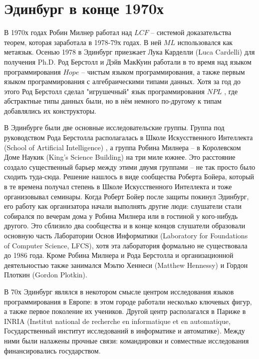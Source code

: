 \documentclass[14pt]{matmex-diploma-custom}
\begin{document}
\section{Эдинбург в конце 1970х}
В 1970х годах Робин Милнер работал над $LCF$ -- системой доказательства теорем, которая заработала в 1978-79х годах. В ней $M\!L$ использовался как метаязык. 
Осенью 1978 в Эдинбург приезжает Лука Карделли (Luca Cardelli) для получения Ph.D. Род Берстолл и Дэйв МакКуин работали в то время над языком программирования $Hope$ \cite{hope1} -- чистым языком программирования, а также первым языком программирования с алгебраическими типами данных. Хотя за год до этого Род Берстолл сделал "игрушечный" язык программирования $N\!P\!L$ \cite{npl1}, где абстрактные типы данных были, но в нём немного по-другому к типам добавлялись их конструкторы.

В Эдинбурге были две основные исследовательские группы. Группа под руководством Рода Берстолла располагалась в Школе Искусственного Интеллекта (School of Artificial Intelligence) 
, а группа Робина Милнера -- в Королевском Доме Наукик (King’s Science Building) на три миле южнее. Это расстояние создало существенный барьер между этими двумя группами -- не так просто было сходить туда-сюда. Решение нашлось в виде сообщества Роберта Бойера, который в те времена получал степень в Школе Искусственного Интеллекта и тоже организовывал семинары.
Когда Роберт Бойер после защиты покинул Эдинбург, его работу как организатора начали выполнять другие люди: слушатели стали  собирался по вечерам дома у Робина Милнера  или в гостиной у кого-нибудь другого. Это сблизило два сообщества и в конце концов слушатели образовали основную часть Лаборатории Основ Информатики (Laboratory for Foundations of Computer Science, LFCS), хотя эта лаборатория формально не существовала до 1986 года.  Кроме Робина Милнера и Рода Берстолла и организационной деятельностью также занимался Мэьтю Хеннеси (Matthew Hennessy) и Гордон Плоткин (Gordon Plotkin).

В 70х Эдинбург являлся в некотором смысле центром исследования языков программирования в Европе: в этом городе работали несколько ключевых фигур, а также первое поколение их учеников. Другой центр располагался в Париже в INRIA (Institut national de recherche en informatique et en automatique, Государственный институт исследований в информатике и автоматике). Между ними были налажены прочные связи: командировки и совместные исследования финансировались государством.
\end{document}
